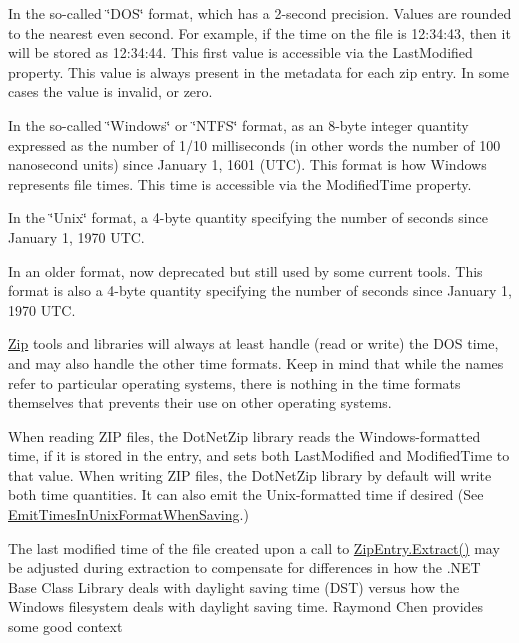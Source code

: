 \begin{DoxyItemize}
\item In the so-\/called \char`\"{}\+D\+O\+S\char`\"{} format, which has a 2-\/second precision. Values are rounded to the nearest even second. For example, if the time on the file is 12\+:34\+:43, then it will be stored as 12\+:34\+:44. This first value is accessible via the {\ttfamily Last\+Modified} property. This value is always present in the metadata for each zip entry. In some cases the value is invalid, or zero. 


\item In the so-\/called \char`\"{}\+Windows\char`\"{} or \char`\"{}\+N\+T\+F\+S\char`\"{} format, as an 8-\/byte integer quantity expressed as the number of 1/10 milliseconds (in other words the number of 100 nanosecond units) since January 1, 1601 (U\+TC). This format is how Windows represents file times. This time is accessible via the {\ttfamily Modified\+Time} property. 


\item In the \char`\"{}\+Unix\char`\"{} format, a 4-\/byte quantity specifying the number of seconds since January 1, 1970 U\+TC. 


\item In an older format, now deprecated but still used by some current tools. This format is also a 4-\/byte quantity specifying the number of seconds since January 1, 1970 U\+TC. 


\end{DoxyItemize}

\mbox{\hyperlink{namespace_super_tiled2_unity_1_1_ionic_1_1_zip}{Zip}} tools and libraries will always at least handle (read or write) the D\+OS time, and may also handle the other time formats. Keep in mind that while the names refer to particular operating systems, there is nothing in the time formats themselves that prevents their use on other operating systems. 

When reading Z\+IP files, the Dot\+Net\+Zip library reads the Windows-\/formatted time, if it is stored in the entry, and sets both {\ttfamily Last\+Modified} and {\ttfamily Modified\+Time} to that value. When writing Z\+IP files, the Dot\+Net\+Zip library by default will write both time quantities. It can also emit the Unix-\/formatted time if desired (See \mbox{\hyperlink{class_super_tiled2_unity_1_1_ionic_1_1_zip_1_1_zip_entry_afd50bda347e67681780f32ebdba43f58}{Emit\+Times\+In\+Unix\+Format\+When\+Saving}}.) 

The last modified time of the file created upon a call to {\ttfamily \mbox{\hyperlink{class_super_tiled2_unity_1_1_ionic_1_1_zip_1_1_zip_entry_a9d65543aadd23e47e188175412891b42}{Zip\+Entry.\+Extract()}}} may be adjusted during extraction to compensate for differences in how the .N\+ET Base Class Library deals with daylight saving time (D\+ST) versus how the Windows filesystem deals with daylight saving time. Raymond Chen provides some good context

